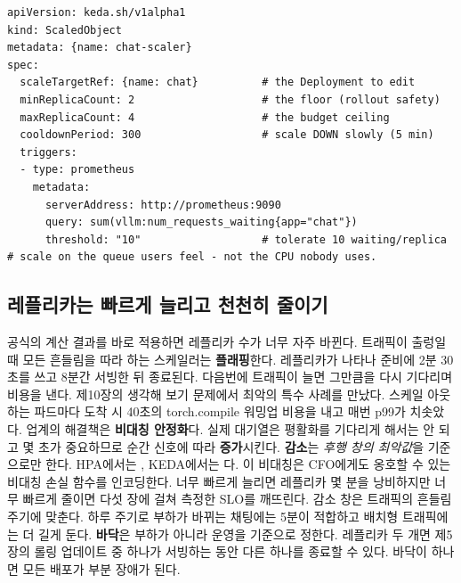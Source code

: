 \begin{terminalbox}
\begin{Verbatim}[breaklines=true,breakanywhere=true,fontsize=\small,formatcom=\color{tbbtermfg},codes=\tbbcodeactive]
apiVersion: keda.sh/v1alpha1
kind: ScaledObject
metadata: {name: chat-scaler}
spec:
  scaleTargetRef: {name: chat}          # the Deployment to edit
  minReplicaCount: 2                    # the floor (rollout safety)
  maxReplicaCount: 4                    # the budget ceiling
  cooldownPeriod: 300                   # scale DOWN slowly (5 min)
  triggers:
  - type: prometheus
    metadata:
      serverAddress: http://prometheus:9090
      query: sum(vllm:num_requests_waiting{app="chat"})
      threshold: "10"                   # tolerate 10 waiting/replica
# scale on the queue users feel - not the CPU nobody uses.
\end{Verbatim}
\end{terminalbox}

\subsection*{레플리카는 빠르게 늘리고 천천히 줄이기}

공식의 계산 결과를 바로 적용하면 레플리카 수가 너무 자주 바뀐다. 트래픽이 출렁일 때 모든 흔들림을 따라 하는 스케일러는 \textbf{플래핑}한다. 레플리카가 나타나 준비에 2분 30초를 쓰고 8분간 서빙한 뒤 종료된다. 다음번에 트래픽이 늘면 그만큼을 다시 기다리며 비용을 낸다. 제10장의 생각해 보기 문제에서 최악의 특수 사례를 만났다. 스케일 아웃하는 파드마다 도착 시 40초의 torch.compile 워밍업 비용을 내고 매번 p99가 치솟았다. 업계의 해결책은 \textbf{비대칭 안정화}다. 실제 대기열은 평활화를 기다리게 해서는 안 되고 몇 초가 중요하므로 순간 신호에 따라 \textbf{증가}시킨다. \textbf{감소}는 \textit{후행 창의 최악값}을 기준으로만 한다. HPA에서는 , KEDA에서는 다. 이 비대칭은 CFO에게도 옹호할 수 있는 비대칭 손실 함수를 인코딩한다. 너무 빠르게 늘리면 레플리카 몇 분을 낭비하지만 너무 빠르게 줄이면 다섯 장에 걸쳐 측정한 SLO를 깨뜨린다. 감소 창은 트래픽의 흔들림 주기에 맞춘다. 하루 주기로 부하가 바뀌는 채팅에는 5분이 적합하고 배치형 트래픽에는 더 길게 둔다. \textbf{바닥}은 부하가 아니라 운영을 기준으로 정한다. 레플리카 두 개면 제5장의 롤링 업데이트 중 하나가 서빙하는 동안 다른 하나를 종료할 수 있다. 바닥이 하나면 모든 배포가 부분 장애가 된다.

